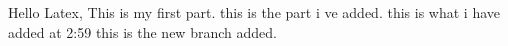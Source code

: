 \documentclass[a4paper]{article}
\begin{document}
Hello Latex, This is my first part.\newline
this is the part i ve added.\newline
this is what i have added at 2:59\newline
this is the new branch added.



\end{document}
